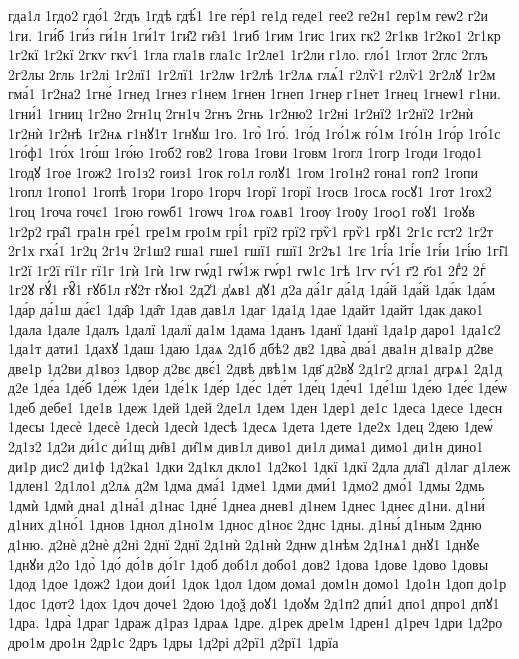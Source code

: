 {гда1л
1гдо2
гдо́1
2гдъ
1гдѣ
гдѣ́1
1ге
ге́р1
ге1д
геде1
гее2
ге2н1
гер1м
геѡ2
г2и
1ги.
1ги́б
1ги́з
ги́1н
1ги́1т
1ги̑2
ги̑з1
1гиб
1гим
1гис
1гих
гк2
2г1кв
1г2ко1
2г1кр
1г2кї
1г2кї
2гкѵ
гкѵ́1
1гла
гла1в
гла1с
1г2ле1
1г2ли
г1ло.
гло́1
1глот
2глс
2глъ
2г2лы
2гль
1г2лі
1г2лї1
1г2лї1
1г2лѡ
1г2лѣ
1г2лѧ
глѧ́1
г2лѷ1
г2лѷ1
2г2лꙋ
1г2м
гма́1
1г2на2
1гне́
1гнед
1гнез
г1нем
1гнен
1гнеп
1гнер
г1нет
1гнец
1гнеѡ1
г1ни.
1гни́1
1гниц
1г2но
2гн1ц
2гн1ч
2гнъ
2гнь
1г2ню2
1г2ні
1г2нї2
1г2нї2
1г2нѝ
1г2нѝ
1г2нѣ
1г2нѧ
г1нꙋ1т
1гнꙋш
1го.
1го̀
1го́.
1го́д
1го́1ж
го́1м
1го́1н
1го́р
1го́1с
1го́ф1
1го́х
1го́ш
1го́ю
1гоб2
гов2
1гова
1гови
1говм
1гогл
1гогр
1годи
1годо1
1годꙋ
1гое
1гож2
1го1з2
гоиз1
1гок
го1л
голꙋ1
1гом
1го1н2
гона1
гоп2
1гопи
1гопл
1гопо1
1гопѣ
1гори
1горо
1горч
1горї
1горї
1госв
1госѧ
госꙋ1
1гот
1гох2
1гоц
1гоча
гочє1
1гою
гоѡб1
1гоѡч
1гоѧ
гоѧв1
1гоѹ
1гоᲂу
1гоѻ1
гоꙋ1
1гоꙋв
1г2р2
гра̑1
гра1н
гре́1
гре1м
гро1м
грі́1
грї2
грї2
грѷ1
грѷ1
грꙋ1
2г1с
гст2
1г2т
2г1х
гха́1
1г2ц
2г1ч
2г1ш2
гша1
гше1
гшї1
гшї1
2г2ъ1
1гє
1гі́а
1гі́е
1гі́и
1гі́ю
1гі̑1
1г2ї
1г2ї
гї1г
гї1г
1гѝ
1гѝ
1гѡ
гѡ́д1
гѡ́1ж
гѡ́р1
гѡ1с
1гѣ
1гѵ
гѵ́1
г҃2
г҃о1
2гⷣ2
2гⷭ
1г2ꙋ
гꙋ́1
гꙋ̑1
гꙋб1л
гꙋ2т
гꙋю1
2д2̾1
д̾ѧв1
д̾ꙋ1
д2а
да́1г
да́1д
1да́й
1да́й
1да́к
1да́м
1да́р
да́1ш
да́є1
1да̑р
1да̑т
1дав
дав1л
1даг
1да1д
1дае
1дайт
1дайт
1дак
дако1
1дала
1дале
1далъ
1далї
1далї
да1м
1дама
1данъ
1данї
1данї
1да1р
даро1
1да1с2
1да1т
дати1
1дахꙋ
1даш
1даю
1даѧ
2д1б
дбѣ2
дв2
1два̀
два́1
два1н
д1ва1р
д2ве
две1р
1д2ви
д1воз
1двор
д2вє
двє́1
2двѣ
двѣ1м
1дв҃
д2вꙋ
2д1г2
дгла1
дгрѧ1
2д1д
д2е
1де́а
1де́б
1де́ж
1де́и
1де́1к
1де́р
1де́с
1де́т
1де́ц
1де́ч1
1де́1ш
1де́ю
1де́є
1де́ѡ
1деб
дебе1
1де1в
1деж
1дей
1дей
2де1л
1дем
1ден
1дер1
де1с
1деса
1десе
1десн
1десы
1десѐ
1десѐ
1десѝ
1десѝ
1десѣ
1десѧ
1дета
1дете
1де2х
1дец
2дею
1деѡ́
2д1з2
1д2и
ди́1с
ди́1щ
ди̑в1
ди̑1м
див1л
диво1
ди1л
дима1
димо1
ди1н
дино1
ди1р
дис2
ди1ф
1д2ка1
1дки
2д1кл
дкло1
1д2ко1
1дкї
1дкї
2дла
дла̑1
д1лаг
д1леж
1длен1
2д1ло1
д2лѧ
д2м
1дма
дма́1
1дме1
1дми
дми́1
1дмо2
дмо́1
1дмы
2дмь
1дмѝ
1дмѝ
дна1
д1на́1
д1нас
1дне́
1днеа
днев1
д1нем
1днес
1днеє
д1ни.
д1ни́
д1них
д1но́1
1днов
1днол
д1но1м
1днос
д1ноє
2днс
1дны.
д1ны́
д1ным
2дню
д1ню.
д2нѐ
д2нѐ
д2ні
2днї
2днї
2д1нѝ
2д1нѝ
2днѡ
д1нѣм
2д1нѧ1
днꙋ1
1днꙋе
1днꙋи
д2о
1до̀
1до́
до́1в
до́1г
1доб
доб1л
добо1
дов2
1дова
1дове
1дово
1довы
1дод
1дое
1дож2
1дои
дои́1
1док
1дол
1дом
дома1
дом1н
домо1
1до1н
1доп
до1р
1дос
1дот2
1дох
1доч
доче1
2дою
1доѯ
доꙋ1
1доꙋм
2д1п2
дпи́1
дпо1
дпро1
дпꙋ1
1дра.
1дра̀
1драг
1драж
д1раз
1драѧ
1дре.
д1рек
дре1м
1дрен1
д1реч
1дри
1д2ро
дро1м
дро1н
2др1с
2дръ
1дры
1д2рі
д2рї1
д2рї1
1дрїа
}
